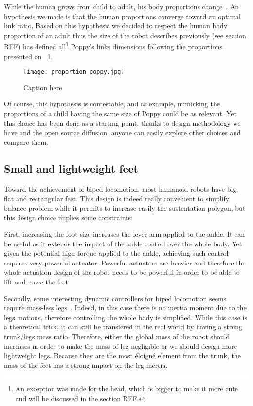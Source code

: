 While the human grows from child to adult, his body proportions change~\cite{REF}. An hypothesis we made is that the human proportions converge toward an optimal link ratio. Based on this hypothesis we decided to respect the human body proportion of an adult thus the size of the robot describes previously (see section REF) has defined all\footnote{An exception was made for the head, which is bigger to make it more cute and will be discussed in the section REF.} Poppy's links dimensions following the proportions presented on \figurename~\ref{fig:poppy-human-proportion}.

\begin{figure}[tb]
    \begin{center}
        \texttt{[image: proportion\_poppy.jpg]}
    \end{center}
    \caption{Caption here}
    \label{fig:poppy-human-proportion}
\end{figure}

Of course, this hypothesis is contestable, and as example, mimicking the proportions of a child having the same size of Poppy could be as relevant. Yet this choice has been done as a starting point, thanks to design methodology we have and the open source diffusion, anyone can easily explore other choices and compare them.

\subsection{Small and lightweight feet} %

Toward the achievement of biped locomotion, most humanoid robots have big, flat and rectangular feet. This design is indeed really convenient to simplify balance problem while it permits to increase easily the sustentation polygon, but this design choice implies some constraints:

First, increasing the foot size increases the lever arm applied to the ankle. It can be useful as it extends the impact of the ankle control over the whole body. Yet given the potential high-torque applied to the ankle, achieving such control requires very powerful actuator.
Powerful actuators are heavier and therefore the whole actuation design of the robot needs to be powerful in order to be able to lift and move the feet.

Secondly, some interesting dynamic controllers for biped locomotion seems require mass-less legs~\cite{REF}. Indeed, in this case there is no inertia moment due to the legs motions, therefore controlling the whole body is simplified. While this case is a theoretical trick, it can still be transfered in the real world by having a strong trunk/legs mass ratio. Therefore, either the global mass of the robot should increases in order to make the mass of leg negligible or we should design more lightweight legs.
Because they are the most éloigné element from the trunk, the mass of the feet has a strong impact on the leg inertia.

